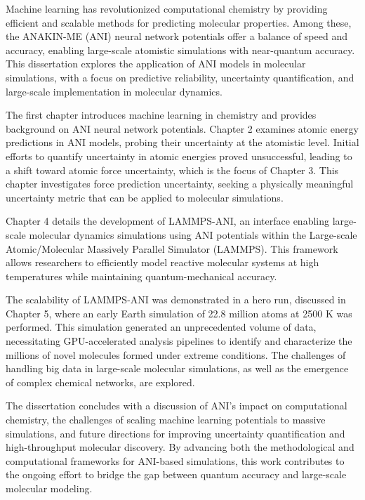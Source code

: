 Machine learning has revolutionized computational chemistry by providing efficient and scalable methods for predicting molecular properties. 
Among these, the ANAKIN-ME (ANI) neural network potentials offer a balance of speed and accuracy, enabling large-scale atomistic simulations with near-quantum accuracy. 
This dissertation explores the application of ANI models in molecular simulations, with a focus on predictive reliability, uncertainty quantification, and large-scale implementation in molecular dynamics.

The first chapter introduces machine learning in chemistry and provides background on ANI neural network potentials. 
Chapter 2 examines atomic energy predictions in ANI models, probing their uncertainty at the atomistic level.
Initial efforts to quantify uncertainty in atomic energies proved unsuccessful, leading to a shift toward atomic force uncertainty, which is the focus of Chapter 3. 
This chapter investigates force prediction uncertainty, seeking a physically meaningful uncertainty metric that can be applied to molecular simulations.

Chapter 4 details the development of LAMMPS-ANI, an interface enabling large-scale molecular dynamics simulations using ANI potentials within the Large-scale Atomic/Molecular Massively Parallel Simulator (LAMMPS). 
This framework allows researchers to efficiently model reactive molecular systems at high temperatures while maintaining quantum-mechanical accuracy.

The scalability of LAMMPS-ANI was demonstrated in a hero run, discussed in Chapter 5, where an early Earth simulation of 22.8 million atoms at 2500 K was performed. 
This simulation generated an unprecedented volume of data, necessitating GPU-accelerated analysis pipelines to identify and characterize the millions of novel molecules formed under extreme conditions. 
The challenges of handling big data in large-scale molecular simulations, as well as the emergence of complex chemical networks, are explored.

The dissertation concludes with a discussion of ANI's impact on computational chemistry, the challenges of scaling machine learning potentials to massive simulations, and future directions for improving uncertainty quantification and high-throughput molecular discovery. 
By advancing both the methodological and computational frameworks for ANI-based simulations, this work contributes to the ongoing effort to bridge the gap between quantum accuracy and large-scale molecular modeling.